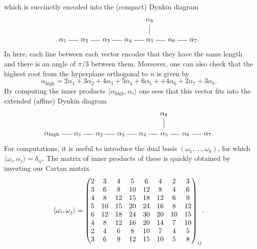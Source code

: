 \documentclass{article}
\begin{document}
which is succinctly encoded into the (compact) Dynkin diagram
\begin{equation}
    \begin{tikzpicture}
    \draw (1,0) node [anchor = west] {$\alpha_1$};
    \draw (1.6,0) -- (2.1,0) node [anchor = west] {$\alpha_2$};
    \draw (2.7,0) -- (3.2,0) node [anchor = west] {$\alpha_3$};
    \draw (3.8,0) -- (4.3,0) node [anchor = west] {$\alpha_4$};
    \draw (4.9,0) -- (5.4,0) node [anchor = west] {$\alpha_5$};
    \draw (6,0) -- (6.5,0) node [anchor = west] {$\alpha_6$};
    \draw (7.1,0) -- (7.6,0) node [anchor = west] {$\alpha_7$.};
    \draw (5.7,0.3) -- (5.7,0.8) node [anchor = south] {$\alpha_8$}; 
    \end{tikzpicture}
\end{equation}
In here, each line between each vector encodes that they have the same length and there is an angle of $\pi/3$ between them. Moreover, one can also check that the highest root from the hyperplane orthogonal to $n$ is given by
\begin{equation}
\alpha_{\textrm{high}}=2\alpha_1+3\alpha_2+4\alpha_3+5\alpha_4+6\alpha_5++ 4\alpha_6+2\alpha_7+3\alpha_8.
\end{equation}
By computing the inner products $\langle\alpha_{\textrm{high}},\alpha_i\rangle$ one sees that this vector fits into the extended (affine) Dynkin diagram
\begin{equation}\label{eq:affine_E_8}
    \begin{tikzpicture}
    \draw (0,0) node {$\alpha_{\text{high}}$};
    \draw (0.5,0) -- (1,0) node [anchor = west] {$\alpha_1$};
    \draw (1.6,0) -- (2.1,0) node [anchor = west] {$\alpha_2$};
    \draw (2.7,0) -- (3.2,0) node [anchor = west] {$\alpha_3$};
    \draw (3.8,0) -- (4.3,0) node [anchor = west] {$\alpha_4$};
    \draw (4.9,0) -- (5.4,0) node [anchor = west] {$\alpha_5$};
    \draw (6,0) -- (6.5,0) node [anchor = west] {$\alpha_6$};
    \draw (7.1,0) -- (7.6,0) node [anchor = west] {$\alpha_7$.};
    \draw (5.7,0.3) -- (5.7,0.8) node [anchor = south] {$\alpha_8$}; 
    \end{tikzpicture}
\end{equation}
For computations, it is useful to introduce the dual basis $(\omega_1,\dots,\omega_8)$, for which $\langle\omega_i,\alpha_j\rangle=\delta_{ij}$. The matrix of inner products of these is quickly obtained by inverting our Cartan matrix
\begin{equation}
\langle\omega_i,\omega_j\rangle=\mqty(2 & 3 & 4 & 5 & 6 & 4 & 2 & 3\\
3 & 6 & 8 &10 &12 & 8 & 4 & 6\\
4 & 8 &12 &15 &18 &12 & 6 & 9\\
5 &10 &15 &20 &24 &16 & 8 &12\\
6 &12 &18 &24 &30 &20 &10 &15\\
4 & 8 &12 &16 &20 &14 & 7 &10\\
2 & 4 & 6 & 8 &10 & 7 & 4 & 5\\
3 & 6 & 9 &12 &15 &10 & 5 & 8\\)_{ij}.
\end{equation}
\end{document}

